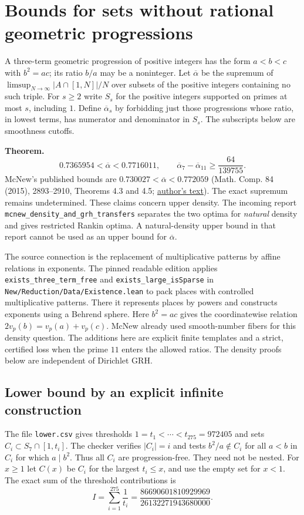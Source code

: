 \section{Bounds for sets without rational geometric progressions}\label{sec:density}
A three-term geometric progression of positive integers has the form
$a<b<c$ with $b^2=ac$; its ratio $b/a$ may be a noninteger. Let
$\overline\alpha$ be the supremum of $\limsup_{N\to\infty}|A\cap[1,N]|/N$
over subsets of the positive integers containing no such triple.
For $s\ge2$ write $S_s$ for the positive integers supported on primes at
most $s$, including $1$. Define $\overline\alpha_s$ by forbidding just
those progressions whose ratio, in lowest terms, has numerator and
denominator in $S_s$. The subscripts below are smoothness cutoffs.

\medskip\noindent\textbf{Theorem.}
\[
  0.7365954 < \overline\alpha < 0.7716011,\qquad
  \overline\alpha_7-\overline\alpha_{11}\ge \frac{64}{139755}.
\]
McNew's published bounds are $0.730027<\overline\alpha<0.772059$
(Math. Comp. 84 (2015), 2893--2910, Theorems 4.3 and 4.5;
\href{https://www.nathanmcnew.com/GPFsets.pdf}{author's text}).
The exact supremum remains undetermined. These claims concern upper
density. The incoming report \texttt{mcnew\_density\_and\_grh\_transfers}
separates the two optima for \emph{natural} density and gives restricted
Rankin optima. A natural-density upper bound in that report cannot be
used as an upper bound for $\overline\alpha$.

The source connection is the replacement of multiplicative patterns by
affine relations in exponents. The pinned readable edition applies
\texttt{exists\_three\_term\_free} and \texttt{exists\_large\_isSparse}
in \texttt{New/Reduction/Data/Existence.lean} to pack places with
controlled multiplicative patterns. There it represents places by
powers and constructs exponents using a Behrend sphere. Here $b^2=ac$
gives the coordinatewise relation $2v_p(b)=v_p(a)+v_p(c)$.
McNew already used smooth-number fibers for this density question.
The additions here are explicit finite templates and a strict,
certified loss when the prime $11$ enters the allowed ratios.
The density proofs below are independent of Dirichlet GRH.

\subsection*{Lower bound by an explicit infinite construction}
The file \texttt{lower.csv} gives thresholds
$1=t_1<\cdots<t_{275}=972405$ and sets $C_i\subset S_7\cap[1,t_i]$.
The checker verifies $|C_i|=i$ and tests $b^2/a\notin C_i$
for all $a<b$ in $C_i$ for which $a\mid b^2$. Thus all $C_i$ are
progression-free. They need not be nested. For $x\ge1$ let
$C(x)$ be $C_i$ for the largest $t_i\le x$, and use the empty set
for $x<1$. The exact sum of the threshold contributions is
\[
 I=\sum_{i=1}^{275}\frac1{t_i}
  =\frac{86690601810929969}{26132271943680000}.
\]

